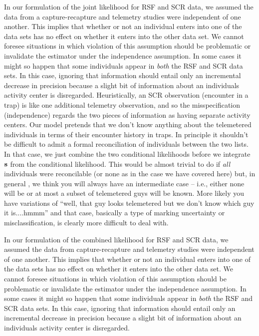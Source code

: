 In our formulation of the joint likelihood for RSF and SCR data, we
assumed the data from a capture-recapture and telemetry studies were
independent of one another. This implies that whether or not an
individual enters into one of the data sets has no effect on whether
it enters into the other data set. We cannot foresee situations in
which violation of this assumption should be problematic or invalidate
the estimator under the independence assumption.  In some cases it
might so happen that some individuals appear in {\it both} the RSF and
SCR data sets. In this case, ignoring that information should entail
only an incremental decrease in precision because a slight bit of
information about an individuals activity center is
disregarded. Heuristically, an SCR observation (encounter in a trap)
is like one additional telemetry observation, and so the
misspecification (independence)
regards the
two pieces of information as having separate activity centers.
 Our model pretends that we don't know anything
about the telemetered individuals in terms of their encounter history
in traps.  In principle it shouldn't be difficult to admit a formal
reconciliation of individuals between the two lists. In that case, we
just combine the two conditional likelihoods before we integrate ${\bf
  s}$ from the conditional likelihood. This would be almost trivial to
do if {\it all} individuals were reconcilable (or none as in the case
we have covered here) but, in general , we think you will always have
an intermediate case -- i.e., either none will be or at most a subset
of telemetered guys will be known. More likely you have variations of ``well, that
guy looks telemetered but we don't know which guy it is....hmmm'' and
that case, basically a type of marking uncertainty or
misclassification, is clearly more difficult to deal with.


In our formulation of the combined likelihood for RSF and SCR data, we
assumed the data from capture-recapture and telemetry studies were
independent of one another. This implies that whether or not an
individual enters into one of the data sets has no effect on whether
it enters into the other data set. We cannot foresee situations in
which violation of this assumption should be problematic or invalidate
the estimator under the independence assumption.  In some cases it
might so happen that some individuals appear in {\it both} the RSF and
SCR data sets. In this case, ignoring that information should entail
only an incremental decrease in precision because a slight bit of
information about an individuals activity center is disregarded.



